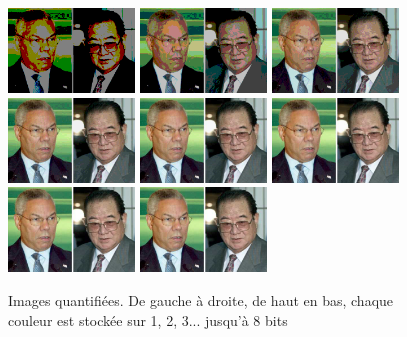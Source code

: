 \documentclass[a4paper,12pt, openany]{book}
\theoremstyle{break}
\begin{document}
\begin{figure}[H]
\centering
\includegraphics[width=0.3\textwidth]{images/quantified_test2.png}\hfill
\includegraphics[width=0.3\textwidth]{images/quantified_test4.png}\hfill
\includegraphics[width=0.3\textwidth]{images/quantified_test8.png}\hfill
\includegraphics[width=0.3\textwidth]{images/quantified_test16.png}\hfill
\includegraphics[width=0.3\textwidth]{images/quantified_test32.png}\hfill
\includegraphics[width=0.3\textwidth]{images/quantified_test64.png}\hfill
\includegraphics[width=0.3\textwidth]{images/quantified_test128.png}
\includegraphics[width=0.3\textwidth]{images/quantified_test256.png}

\caption{Images quantifiées. De gauche à droite, de haut en bas, chaque couleur est stockée sur 1, 2, 3... jusqu'à 8 bits}
\label{fig:quantif}
\end{figure}
\end{document}
